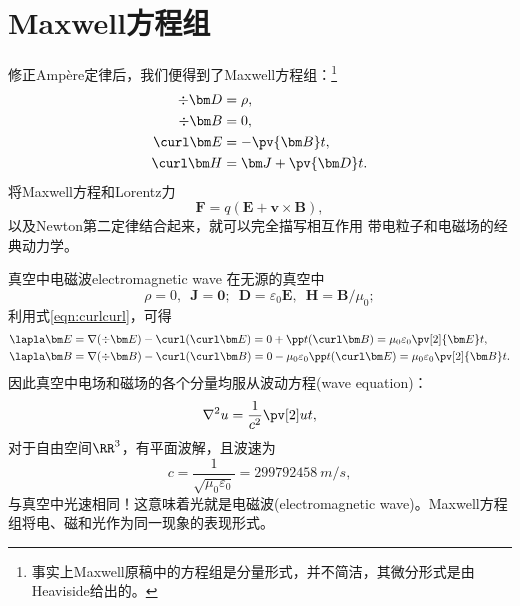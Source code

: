 \section{Maxwell方程组}
修正Ampère定律后，我们便得到了Maxwell方程组：\footnote{事实上Maxwell原稿中的方程组是分量形式，并不简洁，其微分形式是由Heaviside给出的。}
\begin{subequations}
    \begin{align}
        \label{eqn:Maxwell divD}
        \div\bm D&=\rho,\\
        \label{eqn:Maxwell divB}
        \div\bm B&=0,\\
        \label{eqn:Maxwell curlE}
        \curl\bm E&=-\pv{\bm B}t,\\
        \label{eqn:Maxwell curlH}
        \curl\bm H&=\bm J+\pv{\bm D}t.
    \end{align}
\end{subequations}
将Maxwell方程和Lorentz力
\begin{equation}
    \label{eqn:Lorentz}
    \bm F=q(\bm E+\bm v\times\bm B),
\end{equation}
以及Newton第二定律结合起来，就可以完全描写相互作用 带电粒子和电磁场的经典动力学。
\begin{example}{真空中电磁波}{electromagnetic wave}
    在无源的真空中
    \[
        \rho=0,\enspace\bm J=\bm 0;\enspace\bm D=\varepsilon_0\bm E,\enspace\bm H=\bm B/\mu_0;
    \]
    利用式\eqref{eqn:curlcurl}，可得
    \begin{align*}
        \lapla\bm E&=\nabla(\div\bm E)-\curl(\curl\bm E)=0+\pp t(\curl\bm B)
        =\mu_0\varepsilon_0\pv[2]{\bm E}t,\\
        \lapla\bm B&=\nabla(\div\bm B)-\curl(\curl\bm B)=0-\mu_0\varepsilon_0\pp t(\curl\bm E)
        =\mu_0\varepsilon_0\pv[2]{\bm B}t.
    \end{align*}
    因此真空中电场和磁场的各个分量均服从波动方程(wave equation)：
    \begin{equation}
        \nabla^2u=\frac1{c^2}\pv[2]ut,
    \end{equation}
    对于自由空间$\RR^3$，有平面波解，且波速为
    \begin{equation}
        c=\frac1{\sqrt{\mu_0\varepsilon_0}}=\SI{299 792 458}{m/s},
    \end{equation}
    与真空中光速相同！这意味着光就是电磁波(electromagnetic wave)。Maxwell方程组将电、磁和光作为同一现象的表现形式。
\end{example}

